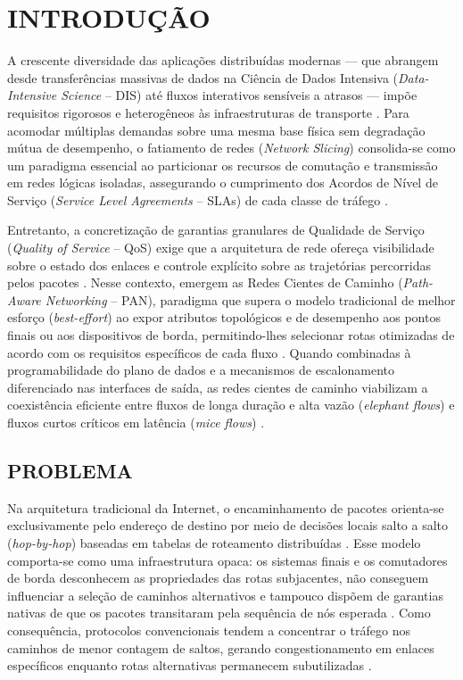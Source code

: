 \chapter{INTRODUÇÃO}\label{chap:introducao}

A crescente diversidade das aplicações distribuídas modernas --- que abrangem desde transferências massivas de dados na Ciência de Dados Intensiva (\textit{Data-Intensive Science} -- DIS) até fluxos interativos sensíveis a atrasos --- impõe requisitos rigorosos e heterogêneos às infraestruturas de transporte \cite{paraiso2025dis, puttaswamy2025pathaware}. Para acomodar múltiplas demandas sobre uma mesma base física sem degradação mútua de desempenho, o fatiamento de redes (\textit{Network Slicing}) consolida-se como um paradigma essencial ao particionar os recursos de comutação e transmissão em redes lógicas isoladas, assegurando o cumprimento dos Acordos de Nível de Serviço (\textit{Service Level Agreements} -- SLAs) de cada classe de tráfego \cite{afolabi2018network, wei2026panqosr}.

Entretanto, a concretização de garantias granulares de Qualidade de Serviço (\textit{Quality of Service} -- QoS) exige que a arquitetura de rede ofereça visibilidade sobre o estado dos enlaces e controle explícito sobre as trajetórias percorridas pelos pacotes \cite{trammell2022rfc, borges2024pot}. Nesse contexto, emergem as Redes Cientes de Caminho (\textit{Path-Aware Networking} -- PAN), paradigma que supera o modelo tradicional de melhor esforço (\textit{best-effort}) ao expor atributos topológicos e de desempenho aos pontos finais ou aos dispositivos de borda, permitindo-lhes selecionar rotas otimizadas de acordo com os requisitos específicos de cada fluxo \cite{trammell2022rfc, wei2026panqosr}. Quando combinadas à programabilidade do plano de dados e a mecanismos de escalonamento diferenciado nas interfaces de saída, as redes cientes de caminho viabilizam a coexistência eficiente entre fluxos de longa duração e alta vazão (\textit{elephant flows}) e fluxos curtos críticos em latência (\textit{mice flows}) \cite{santos2024mtspolka, puttaswamy2025pathaware}.

\section{PROBLEMA}

Na arquitetura tradicional da Internet, o encaminhamento de pacotes orienta-se exclusivamente pelo endereço de destino por meio de decisões locais salto a salto (\textit{hop-by-hop}) baseadas em tabelas de roteamento distribuídas \cite{postel1981, borges2024pot}. Esse modelo comporta-se como uma infraestrutura opaca: os sistemas finais e os comutadores de borda desconhecem as propriedades das rotas subjacentes, não conseguem influenciar a seleção de caminhos alternativos e tampouco dispõem de garantias nativas de que os pacotes transitaram pela sequência de nós esperada \cite{trammell2022rfc, Unveiling_the_Mystery, borges2024pot}. Como consequência, protocolos convencionais tendem a concentrar o tráfego nos caminhos de menor contagem de saltos, gerando congestionamento em enlaces específicos enquanto rotas alternativas permanecem subutilizadas \cite{paraiso2025dis, mariano2026ml}.

